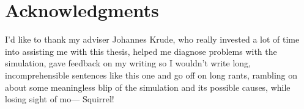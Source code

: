 \cleardoublepage
\chapter*{Acknowledgments}
I'd like to thank my adviser Johannes Krude, who really invested a lot of time
into assisting me with this thesis, helped me diagnose problems with the
simulation, gave feedback on my writing so I wouldn't write long,
incomprehensible sentences like this one and go off on long rants, rambling on
about some meaningless blip of the simulation and its possible causes, while
losing sight of mo--- Squirrel!
